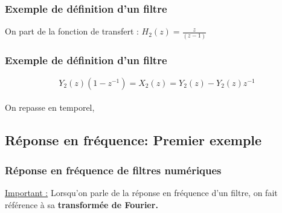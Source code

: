 \documentclass{beamer}
\begin{document}
\begin{frame}
\frametitle{Exemple de définition d'un filtre}
On part de la fonction de transfert : $H_2(z) = \frac{\displaystyle z}{\displaystyle (z-1) }$\\
\vspace{0.3cm}

\vspace{0.3cm}
\vspace{0.3cm}

\end{frame}

\begin{frame}
\frametitle{Exemple de définition d'un filtre}
\[ Y_2(z)(1 - z^{-1})  = X_2(z)  = Y_2(z) - Y_2(z)z^{-1}  \]\\
\vspace{0.3cm} 
On repasse en temporel,
\\
\vspace{0.2cm}


\vspace{0.3cm}

\end{frame}

\subsection{Réponse en fréquence: Premier exemple}
\begin{frame}
\frametitle{Réponse en fréquence de filtres numériques}
\underline{Important :} Lorsqu'on parle de la réponse en fréquence d'un filtre, on fait référence à sa \textbf{transformée de Fourier.}\\
\vspace{0.3cm}


\vspace{0.4cm}
\end{frame}
\end{document}
